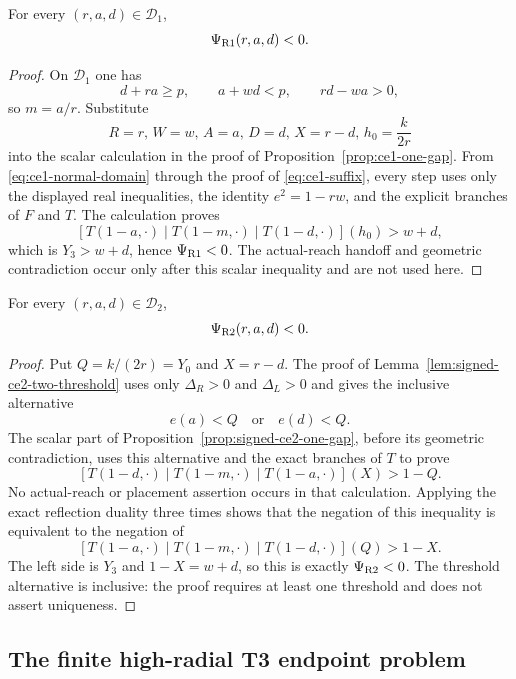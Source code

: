 \begin{theorem}[Pure S2-R1]
\label{thm:s2-univ-r1}
For every $(r,a,d)\in\mathcal D_1$,
\[
 \Psi_{\rm R1}(r,a,d)<0.
\]
\end{theorem}

\begin{proof}
On $\mathcal D_1$ one has
\[
 d+ra\ge p,\qquad a+wd<p,
 \qquad rd-wa>0,
\]
so $m=a/r$.  Substitute
\[
 R=r,\,W=w,\,A=a,\,D=d,\,
 X=r-d,\,h_0=\frac{k}{2r}
\]
into the scalar calculation in the proof of
Proposition~\ref{prop:ce1-one-gap}.  From
\eqref{eq:ce1-normal-domain} through the proof of
\eqref{eq:ce1-suffix}, every step uses only the displayed real inequalities,
the identity $e^2=1-rw$, and the explicit branches of $F$ and $T$.
The calculation proves
\[
 [T(1-a,\cdot)\mid T(1-m,\cdot)\mid T(1-d,\cdot)](h_0)>w+d,
\]
which is $Y_3>w+d$, hence $\Psi_{\rm R1}<0$.  The actual-reach handoff and
geometric contradiction occur only after this scalar inequality and are not
used here.
\end{proof}

\begin{theorem}[Pure S2-R2]
\label{thm:s2-univ-r2}
For every $(r,a,d)\in\mathcal D_2$,
\[
 \Psi_{\rm R2}(r,a,d)<0.
\]
\end{theorem}

\begin{proof}
Put $Q=k/(2r)=Y_0$ and $X=r-d$.  The proof of
Lemma~\ref{lem:signed-ce2-two-threshold} uses only
$\Delta_R>0$ and $\Delta_L>0$ and gives the inclusive alternative
\[
 e(a)<Q\quad\text{or}\quad e(d)<Q.
\]
The scalar part of Proposition~\ref{prop:signed-ce2-one-gap}, before its
geometric contradiction, uses this alternative and the exact branches of
$T$ to prove
\[
 [T(1-d,\cdot)\mid T(1-m,\cdot)\mid T(1-a,\cdot)](X)>1-Q.
\]
No actual-reach or placement assertion occurs in that calculation.  Applying
the exact reflection duality three times shows that the negation of this
inequality is equivalent to the negation of
\[
 [T(1-a,\cdot)\mid T(1-m,\cdot)\mid T(1-d,\cdot)](Q)>1-X.
\]
The left side is $Y_3$ and $1-X=w+d$, so this is exactly
$\Psi_{\rm R2}<0$.  The threshold alternative is inclusive: the proof
requires at least one threshold and does not assert uniqueness.
\end{proof}

\subsection{The finite high-radial T3 endpoint problem}

